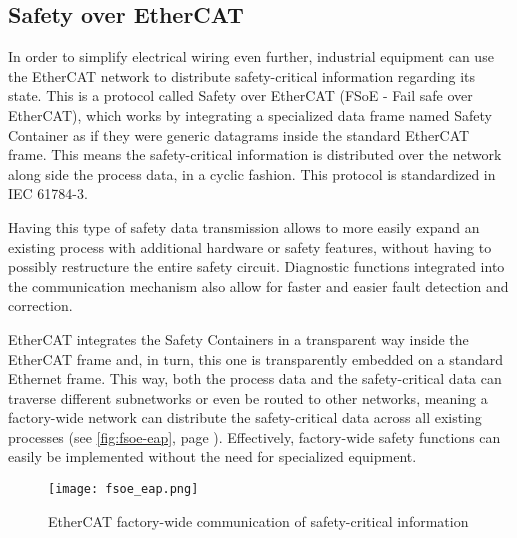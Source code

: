\subsection{Safety over EtherCAT}

In order to simplify electrical wiring even further, industrial equipment can use the EtherCAT network to distribute safety-critical information regarding its state.
This is a protocol called Safety over EtherCAT (FSoE - Fail safe over EtherCAT), which works by integrating a specialized data frame named Safety Container as if they were generic datagrams inside the standard EtherCAT frame.
This means the safety-critical information is distributed over the network along side the process data, in a cyclic fashion.
This protocol is standardized in IEC 61784-3.

Having this type of safety data transmission allows to more easily expand an existing process with additional hardware or safety features, without having to possibly restructure the entire safety circuit.
Diagnostic functions integrated into the communication mechanism also allow for faster and easier fault detection and correction.

EtherCAT integrates the Safety Containers in a transparent way inside the EtherCAT frame and, in turn, this one is transparently embedded on a standard Ethernet frame.
This way, both the process data and the safety-critical data can traverse different subnetworks or even be routed to other networks, meaning a factory-wide network can distribute the safety-critical data across all existing processes (see \autoref{fig:fsoe-eap}, page \pageref{fig:fsoe-eap}).
Effectively, factory-wide safety functions can easily be implemented without the need for specialized equipment.

\begin{figure}[t]
	\centering
	\texttt{[image: fsoe\_eap.png]}
	\caption{EtherCAT factory-wide communication of safety-critical information \cite{technology:fsoe}}
	\label{fig:fsoe-eap}
\end{figure}

